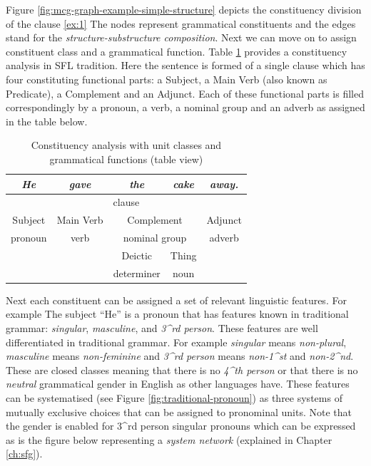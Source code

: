 Figure \ref{fig:mcg-graph-example-simple-structure} depicts the constituency division of the clause \ref{ex:1}%
The nodes represent grammatical constituents and the edges stand for the \textit{structure-substructure composition}. 
Next we can move on to assign constituent class and a grammatical function. Table \ref{tab:sfg-constituency-analisys} provides a constituency analysis in SFL tradition. Here the sentence is formed of a single clause which has four constituting functional parts: a Subject, a Main Verb (also known as Predicate), a Complement and an Adjunct. Each of these functional parts is filled correspondingly by a pronoun, a verb, a nominal group and an adverb as assigned in the table below.

\begin{table}[!ht]
    \centering
    \begin{tabular}{cc|c|c|c}
        \hline
        \multicolumn{1}{|c|}{\textit{He}} & \textit{gave} & \textit{the}     & \textit{cake}   & \multicolumn{1}{c|}{\textit{away.}} \\ \hline
        \multicolumn{5}{|c|}{clause}                                                                                                 \\ \hline
        \multicolumn{1}{|c|}{Subject}     & Main Verb     & \multicolumn{2}{c|}{Complement}    & \multicolumn{1}{c|}{Adjunct}        \\ \hline
        \multicolumn{1}{|c|}{pronoun}      & verb          & \multicolumn{2}{c|}{nominal group} & \multicolumn{1}{c|}{adverb}         \\ \hline
        &               & Deictic          & Thing           &                                     \\ \cline{3-4}
        &               & determiner       & noun            &                                     \\ \cline{3-4}
    \end{tabular}
    \caption{Constituency analysis with unit classes and grammatical functions (table view)}
    \label{tab:sfg-constituency-analisys}
\end{table}

Next each constituent can be assigned a set of relevant linguistic features. For example The subject ``He'' is a pronoun that has features known in traditional grammar: \textit{singular}, \textit{masculine}, and \textit{3^{rd} person}. These features are well differentiated in traditional grammar. For example \textit{singular} means \textit{non-plural}, \textit{masculine} means \textit{non-feminine} and \textit{3^{rd} person} means \textit{non-1^{st}} and \textit{non-2^{nd}}. These are closed classes meaning that there is no \textit{4^{th} person} or that there is no \textit{neutral} grammatical gender in English as other languages have. These features can be systematised (see Figure \ref{fig:traditional-pronoun}) as three systems of mutually exclusive choices that can be assigned to pronominal units. Note that the gender is enabled for 3^{rd} person singular pronouns which can be expressed as is the figure below representing a \textit{system network} (explained in Chapter \ref{ch:sfg}).

